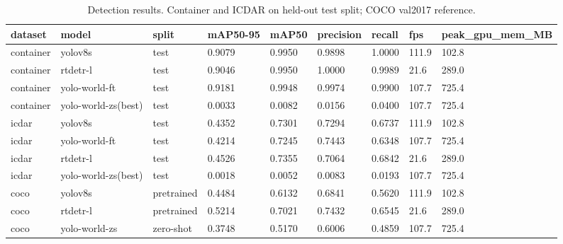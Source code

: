 \begin{table}[t]
\centering
\caption{Detection results. Container and ICDAR on held-out test split; COCO val2017 reference.}\label{tab:main}
\begin{tabular}{lllllllll}
\toprule
\textbf{dataset} & \textbf{model} & \textbf{split} & \textbf{mAP50-95} & \textbf{mAP50} & \textbf{precision} & \textbf{recall} & \textbf{fps} & \textbf{peak\_gpu\_mem\_MB} \\
\midrule
container & yolov8s & test & 0.9079 & 0.9950 & 0.9898 & 1.0000 & 111.9 & 102.8 \\
container & rtdetr-l & test & 0.9046 & 0.9950 & 1.0000 & 0.9989 & 21.6 & 289.0 \\
container & yolo-world-ft & test & 0.9181 & 0.9948 & 0.9974 & 0.9900 & 107.7 & 725.4 \\
container & yolo-world-zs(best) & test & 0.0033 & 0.0082 & 0.0156 & 0.0400 & 107.7 & 725.4 \\
icdar & yolov8s & test & 0.4352 & 0.7301 & 0.7294 & 0.6737 & 111.9 & 102.8 \\
icdar & yolo-world-ft & test & 0.4214 & 0.7245 & 0.7443 & 0.6348 & 107.7 & 725.4 \\
icdar & rtdetr-l & test & 0.4526 & 0.7355 & 0.7064 & 0.6842 & 21.6 & 289.0 \\
icdar & yolo-world-zs(best) & test & 0.0018 & 0.0052 & 0.0083 & 0.0193 & 107.7 & 725.4 \\
coco & yolov8s & pretrained & 0.4484 & 0.6132 & 0.6841 & 0.5620 & 111.9 & 102.8 \\
coco & rtdetr-l & pretrained & 0.5214 & 0.7021 & 0.7432 & 0.6545 & 21.6 & 289.0 \\
coco & yolo-world-zs & zero-shot & 0.3748 & 0.5170 & 0.6006 & 0.4859 & 107.7 & 725.4 \\
\bottomrule
\end{tabular}
\end{table}
